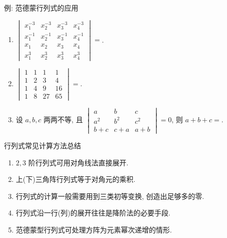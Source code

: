 \begin{frame}{例: 范德蒙行列式的应用}
	\onslide<+->
	\begin{exercise}
		\begin{enumerate}
			\item $\begin{vmatrix}
				x_1^{-3}&x_2^{-3}&x_3^{-3}&x_4^{-3}\\
				x_1^{-1}&x_2^{-1}&x_3^{-1}&x_4^{-1}\\
				x_1&x_2&x_3&x_4\\
				x_1^{3}&x_2^{3}&x_3^{3}&x_4^{3}
			\end{vmatrix}=$.
			\item $\begin{vmatrix}
				1&1&1&1\\
				1&2&3&4\\
				1&4&9&16\\
				1&8&27&65
			\end{vmatrix}=$.
			\item 设 $a,b,c$ 两两不等, 且 $\begin{vmatrix}
				a&b&c\\
				a^2&b^2&c^2\\
				b+c&c+a&a+b
			\end{vmatrix}=0$, 则 $a+b+c=$.
		\end{enumerate}
	\end{exercise}
\end{frame}


\begin{frame}{行列式常见计算方法总结}
	\onslide<+->
	\begin{enumerate}
		\item $2,3$ 阶行列式可用对角线法直接展开.
		\item 上(下)三角阵行列式等于对角元的乘积.
		\item 行列式的计算一般需要用到\alert{三类初等变换}, 创造出足够多的零.
		\item 行列式沿一行(列)的展开往往是\alert{降阶法}的必要手段.
		\item 范德蒙型行列式可处理方阵为元素幂次递增的情形.
	\end{enumerate}
\end{frame}



